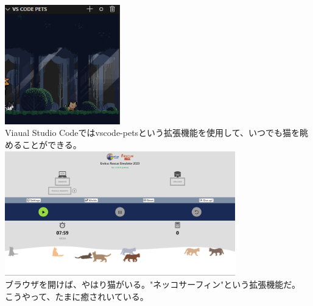 \documentclass[uplatex,dvipdfmx,a4paper]{jsarticle}
\begin{document}
    \includegraphics[width=50mm]{Photo/photo2.png}\\
    Viaual Studio Codeではvscode-petsという拡張機能を使用して、いつでも猫を眺めることができる。\\

    \includegraphics[width=100mm]{Photo/photo3.png}\\
    ブラウザを開けば、やはり猫がいる。"ネッコサーフィン"という拡張機能だ。\\

    こうやって、たまに癒されいている。\\
\end{document}
